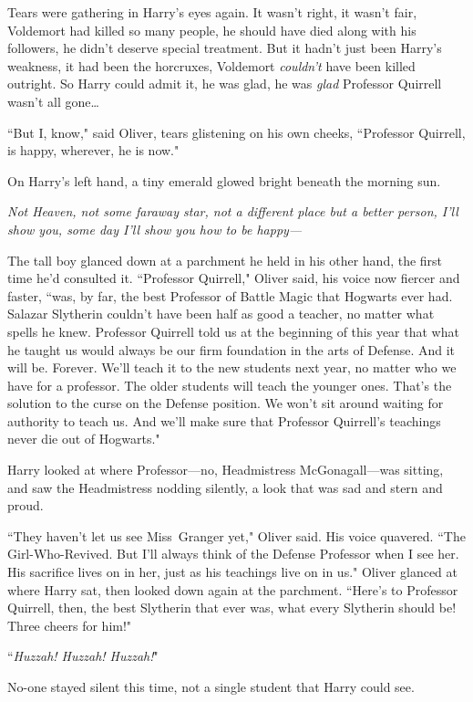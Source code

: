 Tears were gathering in Harry's eyes again. It wasn't right, it wasn't fair, Voldemort had killed so many people, he should have died along with his followers, he didn't deserve special treatment. But it hadn't just been Harry's weakness, it had been the horcruxes, Voldemort \emph{couldn't} have been killed outright. So Harry could admit it, he was glad, he was \emph{glad} Professor Quirrell wasn't all gone{\ldots}

``But I, know," said Oliver, tears glistening on his own cheeks, ``Professor Quirrell, is happy, wherever, he is now."

On Harry's left hand, a tiny emerald glowed bright beneath the morning sun.

\emph{Not Heaven, not some faraway star, not a different place but a better person, I'll show you, some day I'll show you how to be happy—}

The tall boy glanced down at a parchment he held in his other hand, the first time he'd consulted it. ``Professor Quirrell," Oliver said, his voice now fiercer and faster, ``was, by far, the best Professor of Battle Magic that Hogwarts ever had. Salazar Slytherin couldn't have been half as good a teacher, no matter what spells he knew. Professor Quirrell told us at the beginning of this year that what he taught us would always be our firm foundation in the arts of Defense. And it will be. Forever. We'll teach it to the new students next year, no matter who we have for a professor. The older students will teach the younger ones. That's the solution to the curse on the Defense position. We won't sit around waiting for authority to teach us. And we'll make sure that Professor Quirrell's teachings never die out of Hogwarts."

Harry looked at where Professor—no, Headmistress McGonagall—was sitting, and saw the Headmistress nodding silently, a look that was sad and stern and proud.

``They haven't let us see Miss~Granger yet," Oliver said. His voice quavered. ``The Girl-Who-Revived. But I'll always think of the Defense Professor when I see her. His sacrifice lives on in her, just as his teachings live on in us." Oliver glanced at where Harry sat, then looked down again at the parchment. ``Here's to Professor Quirrell, then, the best Slytherin that ever was, what every Slytherin should be! Three cheers for him!"

``\emph{Huzzah! Huzzah! Huzzah!}"

No-one stayed silent this time, not a single student that Harry could see.


